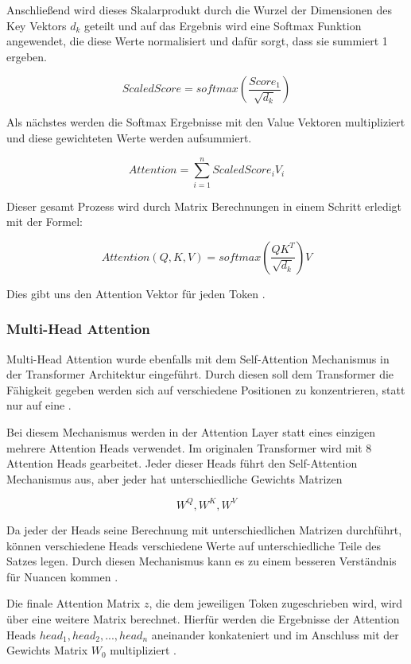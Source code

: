 Anschließend wird dieses Skalarprodukt durch die Wurzel 
der Dimensionen des Key Vektors $d_k$ geteilt und auf das 
Ergebnis wird eine Softmax Funktion angewendet, die diese Werte 
normalisiert und dafür sorgt, dass sie summiert 1 ergeben.

\[Scaled Score=softmax(\frac{Score_1}{\sqrt{d_k}})\]

Als nächstes werden die Softmax Ergebnisse mit den Value Vektoren 
multipliziert und diese gewichteten Werte werden aufsummiert. 

\[Attention=\sum_{i=1}^{n} Scaled Score_iV_i\]

Dieser gesamt Prozess wird durch Matrix Berechnungen in einem Schritt erledigt mit der Formel:

\[Attention(Q, K, V) = softmax(\frac{QK^T}{\sqrt{d_k}})V\]

Dies gibt uns den Attention Vektor für jeden Token \cite{vaswaniAttentionAllYou2023, alammarIllustratedTransformer}.\par

\subsubsection{Multi-Head Attention}
Multi-Head Attention wurde ebenfalls mit dem Self-Attention Mechanismus
in der Transformer Architektur eingeführt. Durch diesen 
soll dem Transformer die Fähigkeit gegeben werden sich auf 
verschiedene Positionen zu konzentrieren, statt nur auf eine \cite{vaswaniAttentionAllYou2023, alammarIllustratedTransformer}.
\par
Bei diesem Mechanismus werden in der Attention Layer 
statt eines einzigen mehrere Attention Heads verwendet. 
Im originalen Transformer wird mit 8 Attention Heads gearbeitet. 
Jeder dieser Heads führt den Self-Attention Mechanismus aus, aber jeder 
hat unterschiedliche Gewichts Matrizen 
 
\[W^Q, W^K, W^V\]

Da jeder der Heads seine Berechnung mit unterschiedlichen 
Matrizen durchführt, können verschiedene Heads verschiedene 
Werte auf unterschiedliche Teile des Satzes legen. Durch diesen 
Mechanismus kann es zu einem besseren Verständnis für Nuancen kommen \cite{vaswaniAttentionAllYou2023, alammarIllustratedTransformer}.\par

Die finale Attention Matrix $z$, die dem jeweiligen Token zugeschrieben 
wird, wird über eine weitere Matrix berechnet. Hierfür werden die 
Ergebnisse der Attention Heads $head_1, head_2, ..., head_n$ aneinander 
konkateniert und im Anschluss mit der Gewichts Matrix $W_0$ multipliziert \cite{vaswaniAttentionAllYou2023, alammarIllustratedTransformer}.

